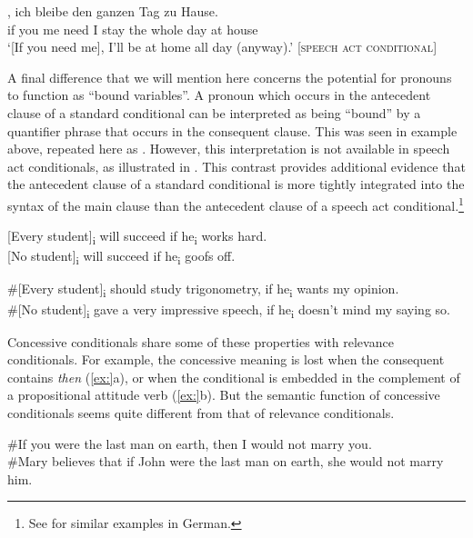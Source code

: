 \ex
  \gll{},  ich  bleibe  den  ganzen  Tag  zu  Hause.\\
 if  you  me  need  I  stay  the  whole  day  at  house\\
\glt ‘[If you need me], I’ll be at home all day (anyway).’   [\textsc{speech act} \textsc{conditional}]
\z
\z

A final difference that we will mention here concerns the potential for pronouns to function as “bound variables”. A pronoun which occurs in the antecedent clause of a standard conditional can be interpreted as being “bound” by a quantifier phrase that occurs in the consequent clause. This was seen in example  above, repeated here as . However, this interpretation is not available in speech act conditionals, as illustrated in . This contrast provides additional evidence that the antecedent clause of a standard conditional is more tightly integrated into the syntax of the main clause than the antecedent clause of a speech act conditional.\footnote{See \citet{EbertEtAl2008} for similar examples in German.}


\ea
\ea{} [Every student]\textsubscript{i} will succeed if he\textsubscript{i} works hard.\\
\ex{} [No student]\textsubscript{i} will succeed if he\textsubscript{i} goofs off.
\z
\z

\ea
\ea \#[Every student]\textsubscript{i} should study trigonometry, if he\textsubscript{i} wants my opinion.\\
\ex \#[No student]\textsubscript{i} gave a very impressive speech, if he\textsubscript{i} doesn’t mind my saying so.
\z
\z

Concessive conditionals share some of these properties with relevance conditionals. For example, the concessive meaning is lost when the consequent contains \textit{then} (\ref{ex:}a), or when the conditional is embedded in the complement of a propositional attitude verb (\ref{ex:}b). But the semantic function of concessive conditionals seems quite different from that of relevance conditionals.


\ea
\ea \#If you were the last man on earth, then I would not marry you.\\
\ex \#Mary believes that if John were the last man on earth, she would not marry him.
\z
\z


